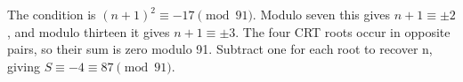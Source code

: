 The condition is $(n+1)^2\equiv-17\pmod{91}$. Modulo seven this gives $n+1\equiv\pm2$, and modulo thirteen it gives $n+1\equiv\pm3$. The four CRT roots occur in opposite pairs, so their sum is zero modulo 91. Subtract one for each root to recover n, giving $S\equiv-4\equiv\boxed{87}\pmod{91}$.
